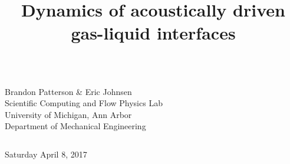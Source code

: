 \title[]{Dynamics of acoustically driven gas-liquid interfaces}
\author[] {}

\institute[]{}
\date[date]{}


\begin{frame} %
\titlepage \vspace{-2.50cm}
\centering
\begin{columns}

 \begin{center}
%
\normalsize{Brandon Patterson \& Eric Johnsen} \vspace{12pt} \\ 
%
\footnotesize{Scientific Computing and Flow Physics Lab} \vspace{4pt}\\
\footnotesize{University of Michigan, Ann Arbor} \vspace{4pt} \\
\scriptsize{Department of Mechanical Engineering} \vspace{4pt} \\
\end{center}
\vspace*{.15cm}
\end{columns}
\begin{center}
%
%
\footnotesize {Saturday April 8, 2017} \vspace{-.1cm}
%
%
\end{center}




\end{frame}
